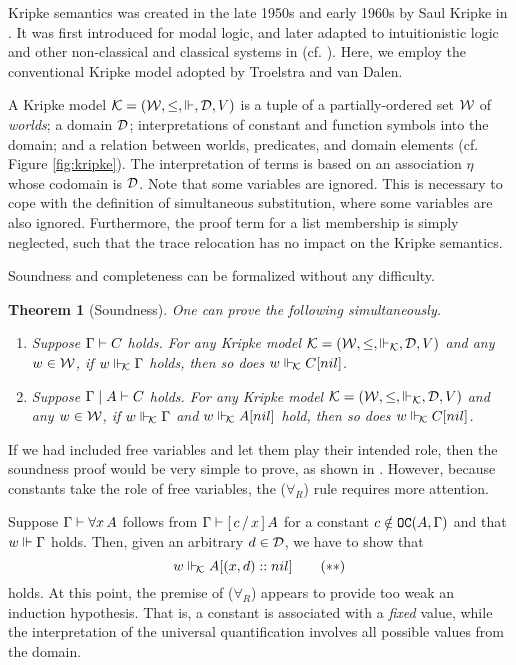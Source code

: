 \documentclass{kms-j}
\theoremstyle{plain}
\newtheorem{thm}{Theorem}[section]
\theoremstyle{remark}
\begin{document}
%
Kripke semantics was created in the late 1950s and early 1960s by Saul
Kripke in \citep{kripke59,kripke63}. It was first introduced for modal
logic, and later adapted to intuitionistic logic and other
non-classical and classical systems in (cf. \citep{TroelstraVanDalen88,danko-gyesik}).
Here, we employ the conventional Kripke model adopted by Troelstra and van Dalen.

A Kripke model $\calk = (\calw, \le,\Vd , \cald, V )$ is a tuple of a
partially-ordered set $\calw$ of {\em worlds}; a domain $\cald$;
interpretations of constant and function symbols into the domain; and a
relation between worlds, predicates, and domain elements
(cf. Figure \ref{fig:kripke}).
The interpretation of terms is based on an association $\eta$
whose codomain is $\cald$.
Note that some variables are ignored.
This is necessary to cope with the definition of simultaneous substitution,
where some variables are also ignored.
Furthermore, the proof term for a list membership is simply neglected,
such that the trace relocation has no impact on the Kripke semantics.

Soundness and completeness can be formalized without any difficulty.

\begin{thm}[Soundness]\label{soundness}
One can prove the following simultaneously.
  \begin{enumerate}
  \item Suppose $\Ga \vd C$ holds. For any Kripke model $\calk =
    (\calw, \le,\Vd_\calk, \cald, V)$ and any $w \in \calw$, if $w
    \Vd_{\!\calk} \Ga$ holds, then so does $w \Vd_{\!\calk} C [nil]$.
  \item Suppose $\Ga \mid A \vd C$ holds. For any Kripke model $\calk
    = (\calw, \le,\Vd_\calk, \cald, V)$ and any $w \in \calw$, if $w
    \Vd_{\!\calk} \Ga$ and $w \Vd_{\!\calk} A [nil]$ hold, then so does $w \Vd_{\!\calk} C [nil]$.
  \end{enumerate}
\end{thm}

If we had included free variables and let them play their intended role,
then the soundness proof
would be very simple to prove, as shown in \citep{wollic09}.
However, because constants take the role of free variables,
the ($\forall_R$) rule requires more attention.

Suppose $\Ga\vd  \forall x\, A$ follows from $\Ga \vd \substs{A}{x}{c}$ for a constant $c \notin \tOC(A, \Ga)$ and that $w \Vd \Ga$ holds. Then, given an arbitrary $d \in \cald$, we have to show that
\begin{equation*}
  w \Vd_{\!\calk} A [(x,d)::nil] \tag{$\ast\ast$}
\end{equation*}
holds.
At this point, the premise of ($\forall_R$) appears to provide too weak an induction hypothesis. That is, a constant is associated with a \textit{fixed} value, while the interpretation of the universal quantification involves all possible values from the domain.
\end{document}
